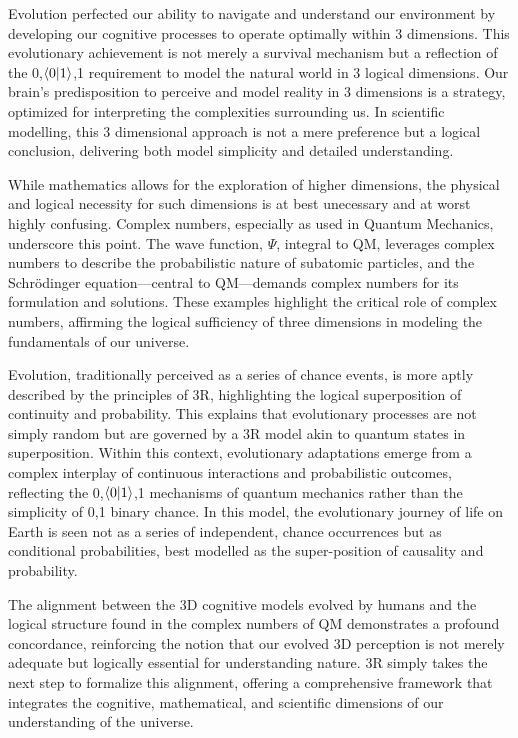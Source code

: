 \documentclass[12pt]{article}
\begin{document}
Evolution perfected our ability to navigate and understand our environment by developing our cognitive processes to operate optimally within 3 dimensions. This evolutionary achievement is not merely a survival mechanism but a reflection of the {0,\(\langle 0 | 1 \rangle\),1} requirement to model the natural world in 3 logical dimensions. Our brain's predisposition to perceive and model reality in 3 dimensions is a strategy, optimized for interpreting the complexities surrounding us. In scientific modelling, this 3 dimensional approach is not a mere preference but a logical conclusion, delivering both model simplicity and detailed understanding.

While mathematics allows for the exploration of higher dimensions, the physical and logical necessity for such dimensions is at best unecessary and at worst highly confusing. Complex numbers, especially as used in Quantum Mechanics, underscore this point. The wave function, \(\Psi\), integral to QM, leverages complex numbers to describe the probabilistic nature of subatomic particles, and the Schrödinger equation—central to QM—demands complex numbers for its formulation and solutions. These examples highlight the critical role of complex numbers, affirming the logical sufficiency of three dimensions in modeling the fundamentals of our universe.

Evolution, traditionally perceived as a series of chance events, is more aptly described by the principles of 3R, highlighting the logical superposition of continuity and probability. This explains that evolutionary processes are not simply random but are governed by a 3R model akin to quantum states in superposition. Within this context, evolutionary adaptations emerge from a complex interplay of continuous interactions and probabilistic outcomes, reflecting the {0,\(\langle 0 | 1 \rangle\),1} mechanisms of quantum mechanics rather than the simplicity of {0,1} binary chance. In this model, the evolutionary journey of life on Earth is seen not as a series of independent, chance occurrences but as conditional probabilities, best modelled as the super-position of causality and probability.

The alignment between the 3D cognitive models evolved by humans and the logical structure found in the complex numbers of QM demonstrates a profound concordance, reinforcing the notion that our evolved 3D perception is not merely adequate but logically essential for understanding nature. 3R simply takes the next step to formalize this alignment, offering a comprehensive framework that integrates the cognitive, mathematical, and scientific dimensions of our understanding of the universe.
\end{document}
